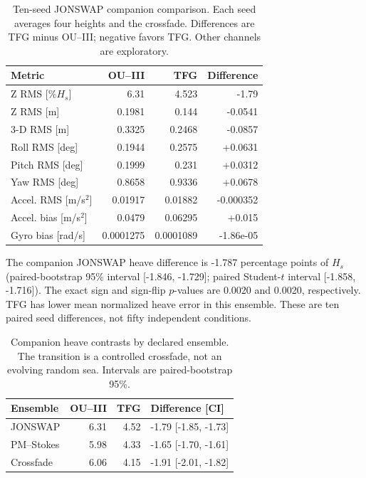 \begin{table}[t]\centering\footnotesize
\caption{Ten-seed JONSWAP companion comparison. Each seed averages four heights and the crossfade. Differences are TFG minus OU--III; negative favors TFG. Other channels are exploratory.}
\label{tab:tfg-paired}\setlength{\tabcolsep}{3pt}
\begin{tabular}{@{}lrrr@{}}\toprule
Metric & OU--III & TFG & Difference\\\midrule
Z RMS [$\%H_s$] & 6.31 & 4.523 & -1.79\\
Z RMS [m] & 0.1981 & 0.144 & -0.0541\\
3-D RMS [m] & 0.3325 & 0.2468 & -0.0857\\
Roll RMS [deg] & 0.1944 & 0.2575 & +0.0631\\
Pitch RMS [deg] & 0.1999 & 0.231 & +0.0312\\
Yaw RMS [deg] & 0.8658 & 0.9336 & +0.0678\\
Accel. RMS [m/s$^2$] & 0.01917 & 0.01882 & -0.000352\\
Accel. bias [m/s$^2$] & 0.0479 & 0.06295 & +0.015\\
Gyro bias [rad/s] & 0.0001275 & 0.0001089 & -1.86e-05\\
\bottomrule\end{tabular}\end{table}
The companion JONSWAP heave difference is -1.787 percentage points of $H_s$ (paired-bootstrap 95\% interval [-1.846, -1.729]; paired Student-$t$ interval [-1.858, -1.716]). The exact sign and sign-flip $p$-values are 0.0020 and 0.0020, respectively. TFG has lower mean normalized heave error in this ensemble.
These are ten paired seed differences, not fifty independent conditions.
\begin{table}[t]\centering\footnotesize
\caption{Companion heave contrasts by declared ensemble. The transition is a controlled crossfade, not an evolving random sea. Intervals are paired-bootstrap 95\%.}
\label{tab:tfg-ensembles}\setlength{\tabcolsep}{3pt}
\begin{tabular}{@{}lrrl@{}}\toprule
Ensemble & OU--III & TFG & Difference [CI]\\\midrule
JONSWAP & 6.31 & 4.52 & -1.79 [-1.85, -1.73]\\
PM--Stokes & 5.98 & 4.33 & -1.65 [-1.70, -1.61]\\
Crossfade & 6.06 & 4.15 & -1.91 [-2.01, -1.82]\\
\bottomrule\end{tabular}\end{table}

